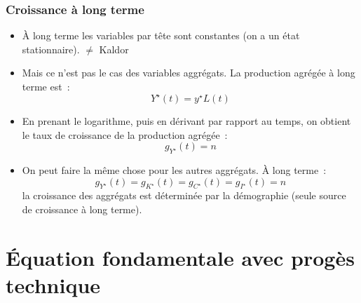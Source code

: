 \documentclass[10pt,notheorems]{beamer}
\theoremstyle{plain}
\theoremstyle{definition} %
\begin{document}
\begin{frame}
  \frametitle{Croissance à long terme}

  \bigskip

  \begin{itemize}

  \item À long terme les variables par tête sont constantes (on a un état stationnaire). {\color{red}$\neq$ Kaldor}\newline

  \item Mais ce n'est pas le cas des variables aggrégats. La production agrégée à long terme est~:
    \[
      Y^{\star}(t) = y^{\star} L(t)
    \]

    \bigskip

  \item En prenant le logarithme, puis en dérivant par rapport au temps, on obtient le taux de croissance de la production agrégée~:
    \[
      g_{Y^{\star}}(t) = n
    \]

  \item On peut faire la même chose pour les autres aggrégats. À long terme~:
    \[
      g_{Y^{\star}}(t) = g_{K^{\star}}(t) = g_{C^{\star}}(t) = g_{I^{\star}}(t) = n
    \]
    la croissance des aggrégats est déterminée par la démographie (seule source de croissance à long terme).


  \end{itemize}

\end{frame}


\section{Équation fondamentale avec progès technique}
\end{document}
